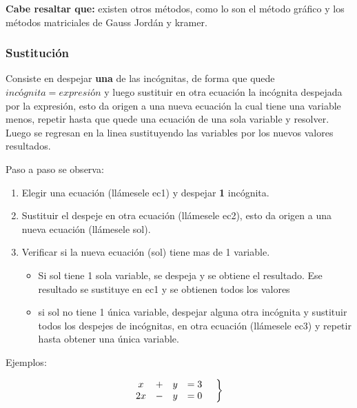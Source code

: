 \documentclass[12pt]{article}
\begin{document}
    \textbf{Cabe resaltar que:} existen otros métodos, como lo son el método
    gráfico y los métodos matriciales de Gauss Jordán y kramer.

    \subsubsection*{Sustitución} \label{Sustitucion}

    Consiste en despejar \textbf{una} de las incógnitas, de forma que quede
    $incógnita=expresión$ y luego sustituir en otra ecuación la incógnita
    despejada por la expresión, esto da origen a una
    nueva ecuación la cual tiene una variable menos, repetir hasta que quede
    una ecuación de una sola variable y resolver. Luego se regresan en la linea
    sustituyendo las variables por los nuevos valores resultados.

    Paso a paso se observa:

    \begin{enumerate}
        \item Elegir una ecuación (llámesele ec1) y despejar \textbf{1} incógnita.
        \item Sustituir el despeje en otra ecuación (llámesele ec2), esto
            da origen a una nueva ecuación (llámesele sol).
        \item Verificar si la nueva ecuación (sol) tiene mas de 1 variable.
            \begin{itemize}
                \item Si sol tiene 1 sola variable, se despeja y se obtiene el
                    resultado. Ese resultado se sustituye en ec1 y se obtienen
                    todos los valores
                \item si sol no tiene 1 única variable, despejar alguna otra incógnita
                    y sustituir todos los despejes de incógnitas,
                    en otra ecuación (llámesele ec3) y repetir hasta
                    obtener una única variable.
            \end{itemize}
    \end{enumerate}

Ejemplos:


    \begin{equation*}
        \left.
        \begin{matrix}
            x &+& y &=3\\
            2x &-& y &=0
        \end{matrix}
        \hspace*{0.5cm}\right\rbrace
    \end{equation*}
\end{document}

